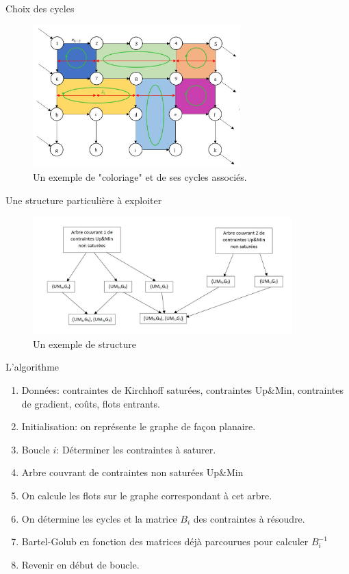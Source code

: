 \documentclass{beamer}
\begin{document}
\begin{frame}{Choix des cycles}
    \begin{figure}[H]
        \centering
        \includegraphics[width=8cm]{coloriage.JPG}
        \caption{Un exemple de "coloriage" et de ses cycles associés.}
        \label{fig:coloriage}
    \end{figure}
\insertframenumber
\end{frame}

\begin{frame}{Une structure particulière à exploiter}
    \begin{figure}[H]
    \centering
    \includegraphics[width=10cm]{arbrecontraintes.JPG}
    \caption{Un exemple de structure}
    \label{fig:pseudoarbre}
\end{figure}
\insertframenumber\end{frame}
\begin{frame}{L'algorithme}
    \begin{enumerate}
        \item Données: contraintes de Kirchhoff saturées, contraintes Up\&Min, contraintes de gradient,  coûts, flots entrants.
        \item Initialisation: on représente le graphe de façon planaire. 
        \item Boucle $i$: Déterminer les contraintes à saturer.
        \item Arbre couvrant de contraintes non saturées Up\&Min
        \item On calcule les flots sur le graphe correspondant à cet arbre.
        \item On détermine les cycles et la matrice $B_i$ des contraintes à résoudre.
        \item Bartel-Golub en fonction des matrices déjà parcourues pour calculer $B_i^{-1}$
        \item Revenir en début de boucle.
    \end{enumerate}
\insertframenumber\end{frame}
\end{document}
